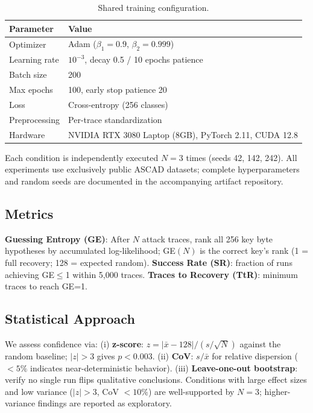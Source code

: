 \documentclass[runningheads]{llncs}
\begin{document}
\begin{table}[t]
\centering
\caption{Shared training configuration.}
\label{tab:config}
\begin{tabular}{@{}ll@{}}
\toprule
\textbf{Parameter} & \textbf{Value} \\
\midrule
Optimizer & Adam ($\beta_1{=}0.9$, $\beta_2{=}0.999$) \\
Learning rate & $10^{-3}$, decay 0.5 / 10 epochs patience \\
Batch size & 200 \\
Max epochs & 100, early stop patience 20 \\
Loss & Cross-entropy (256 classes) \\
Preprocessing & Per-trace standardization \\
Hardware & NVIDIA RTX 3080 Laptop (8GB), PyTorch 2.11, CUDA 12.8 \\
\bottomrule
\end{tabular}
\end{table}

Each condition is independently executed $N{=}3$ times (seeds 42, 142, 242). All experiments use exclusively public ASCAD datasets; complete hyperparameters and random seeds are documented in the accompanying artifact repository.

\subsection{Metrics}

\textbf{Guessing Entropy (GE)}: After $N$ attack traces, rank all 256 key byte hypotheses by accumulated log-likelihood; GE$(N)$ is the correct key's rank (1 = full recovery; 128 = expected random). \textbf{Success Rate (SR)}: fraction of runs achieving GE$\leq$1 within 5,000 traces. \textbf{Traces to Recovery (TtR)}: minimum traces to reach GE=1.

\subsection{Statistical Approach}

We assess confidence via: (i) \textbf{z-score}: $z = |\bar{x} - 128| / (s / \sqrt{N})$ against the random baseline; $|z| > 3$ gives $p < 0.003$. (ii) \textbf{CoV}: $s / \bar{x}$ for relative dispersion ($< 5\%$ indicates near-deterministic behavior). (iii) \textbf{Leave-one-out bootstrap}: verify no single run flips qualitative conclusions. Conditions with large effect sizes and low variance ($|z| > 3$, CoV $< 10\%$) are well-supported by $N{=}3$; higher-variance findings are reported as exploratory.
\end{document}
